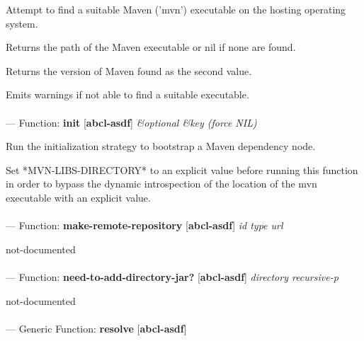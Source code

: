 \begin{adjustwidth}{5em}{5em}
Attempt to find a suitable Maven ('mvn') executable on the hosting operating system.

Returns the path of the Maven executable or nil if none are found.

Returns the version of Maven found as the second value.

Emits warnings if not able to find a suitable executable.
\end{adjustwidth}

\paragraph{}
\label{ABCL-ASDF:INIT}
--- Function: \textbf{init} [\textbf{abcl-asdf}] \textit{\&optional \&key (force NIL)}

\begin{adjustwidth}{5em}{5em}
Run the initialization strategy to bootstrap a Maven dependency node.

Set *MVN-LIBS-DIRECTORY* to an explicit value before running this
function in order to bypass the dynamic introspection of the location
of the mvn executable with an explicit value.
\end{adjustwidth}

\paragraph{}
\label{ABCL-ASDF:MAKE-REMOTE-REPOSITORY}
--- Function: \textbf{make-remote-repository} [\textbf{abcl-asdf}] \textit{id type url}

\begin{adjustwidth}{5em}{5em}
not-documented
\end{adjustwidth}

\paragraph{}
\label{ABCL-ASDF:NEED-TO-ADD-DIRECTORY-JAR?}
--- Function: \textbf{need-to-add-directory-jar?} [\textbf{abcl-asdf}] \textit{directory recursive-p}

\begin{adjustwidth}{5em}{5em}
not-documented
\end{adjustwidth}

\paragraph{}
\label{ABCL-ASDF:RESOLVE}
--- Generic Function: \textbf{resolve} [\textbf{abcl-asdf}] \textit{}

